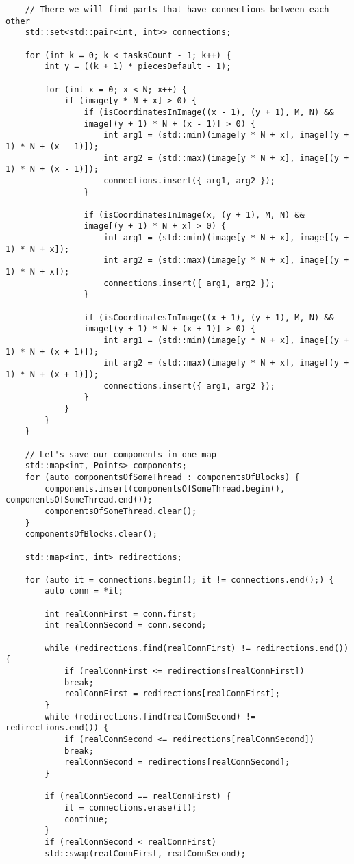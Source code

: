 \documentclass[14pt, russian]{extarticle}
\begin{document}
\begin{lstlisting}
	// There we will find parts that have connections between each other
	std::set<std::pair<int, int>> connections;
	
	for (int k = 0; k < tasksCount - 1; k++) {
		int y = ((k + 1) * piecesDefault - 1);
		
		for (int x = 0; x < N; x++) {
			if (image[y * N + x] > 0) {
				if (isCoordinatesInImage((x - 1), (y + 1), M, N) &&
				image[(y + 1) * N + (x - 1)] > 0) {
					int arg1 = (std::min)(image[y * N + x], image[(y + 1) * N + (x - 1)]);
					int arg2 = (std::max)(image[y * N + x], image[(y + 1) * N + (x - 1)]);
					connections.insert({ arg1, arg2 });
				}
				
				if (isCoordinatesInImage(x, (y + 1), M, N) &&
				image[(y + 1) * N + x] > 0) {
					int arg1 = (std::min)(image[y * N + x], image[(y + 1) * N + x]);
					int arg2 = (std::max)(image[y * N + x], image[(y + 1) * N + x]);
					connections.insert({ arg1, arg2 });
				}
				
				if (isCoordinatesInImage((x + 1), (y + 1), M, N) &&
				image[(y + 1) * N + (x + 1)] > 0) {
					int arg1 = (std::min)(image[y * N + x], image[(y + 1) * N + (x + 1)]);
					int arg2 = (std::max)(image[y * N + x], image[(y + 1) * N + (x + 1)]);
					connections.insert({ arg1, arg2 });
				}
			}
		}
	}
	
	// Let's save our components in one map
	std::map<int, Points> components;
	for (auto componentsOfSomeThread : componentsOfBlocks) {
		components.insert(componentsOfSomeThread.begin(), componentsOfSomeThread.end());
		componentsOfSomeThread.clear();
	}
	componentsOfBlocks.clear();
	
	std::map<int, int> redirections;
	
	for (auto it = connections.begin(); it != connections.end();) {
		auto conn = *it;
		
		int realConnFirst = conn.first;
		int realConnSecond = conn.second;
		
		while (redirections.find(realConnFirst) != redirections.end()) {
			if (realConnFirst <= redirections[realConnFirst])
			break;
			realConnFirst = redirections[realConnFirst];
		}
		while (redirections.find(realConnSecond) != redirections.end()) {
			if (realConnSecond <= redirections[realConnSecond])
			break;
			realConnSecond = redirections[realConnSecond];
		}
		
		if (realConnSecond == realConnFirst) {
			it = connections.erase(it);
			continue;
		}
		if (realConnSecond < realConnFirst)
		std::swap(realConnFirst, realConnSecond);
		

\end{lstlisting}
\end{document}
